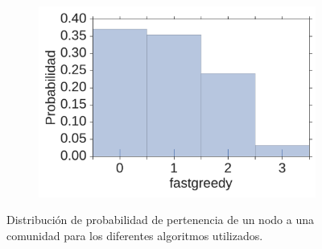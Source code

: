 {\begin{figure}[!ht]
\begin{subfigure}[b]{.45\columnwidth}
    \end{subfigure}
    \begin{subfigure}[b]{.45\columnwidth}
        \includegraphics[width=0.95\columnwidth]{figuras/fastgreedy_probability.pdf}
    \end{subfigure}
    \caption{\label{fig:histos} Distribuci\'on de probabilidad de pertenencia de un nodo a una comunidad 
para los diferentes algoritmos utilizados.}
\end{figure}




}
